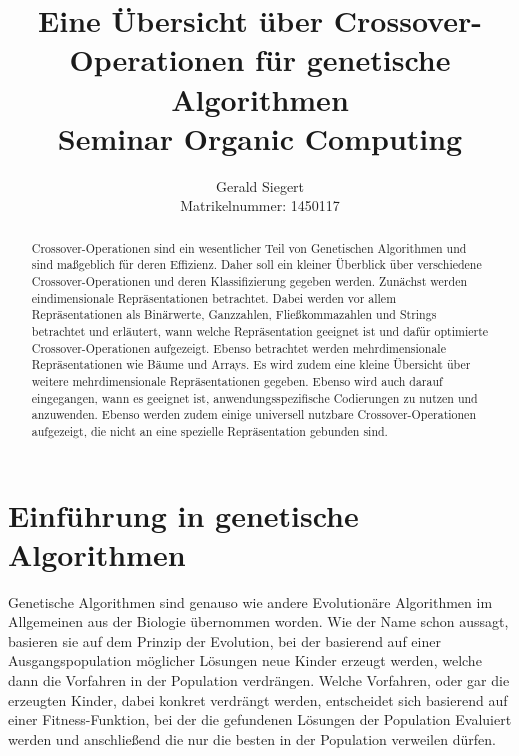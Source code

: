 \documentclass{llncs}
\begin{document}
\mainmatter

\title{Eine Übersicht über Crossover-Operationen für genetische Algorithmen\\Seminar Organic Computing}

\author{Gerald Siegert\\Matrikelnummer: 1450117}
\tocauthor{}


\maketitle


\begin{abstract}
	Crossover-Operationen sind ein wesentlicher Teil von Genetischen Algorithmen und sind maßgeblich für deren Effizienz. Daher soll ein kleiner Überblick über verschiedene Crossover-Operationen und deren Klassifizierung gegeben werden. Zunächst werden eindimensionale Repräsentationen betrachtet. Dabei werden vor allem Repräsentationen als Binärwerte, Ganzzahlen, Fließkommazahlen und Strings betrachtet und erläutert, wann welche Repräsentation geeignet ist und dafür optimierte Crossover-Operationen aufgezeigt. Ebenso betrachtet werden mehrdimensionale Repräsentationen wie Bäume und Arrays. Es wird zudem eine kleine Übersicht über weitere mehrdimensionale Repräsentationen gegeben. Ebenso wird auch darauf eingegangen, wann es geeignet ist, anwendungsspezifische Codierungen zu nutzen und anzuwenden. Ebenso werden zudem einige universell nutzbare Crossover-Operationen aufgezeigt, die nicht an eine spezielle Repräsentation gebunden sind.
\end{abstract}

\pagebreak

\section{Einführung in genetische Algorithmen}
\label{sec:EinfuhrungGA}

	Genetische Algorithmen sind genauso wie andere Evolutionäre Algorithmen im Allgemeinen aus der Biologie übernommen worden. Wie der Name schon aussagt, basieren sie auf dem Prinzip der Evolution, bei der basierend auf einer Ausgangspopulation möglicher Lösungen neue Kinder erzeugt werden, welche dann die Vorfahren in der Population verdrängen. Welche Vorfahren, oder gar die erzeugten Kinder, dabei konkret verdrängt werden, entscheidet sich basierend auf einer Fitness-Funktion, bei der die gefundenen Lösungen der Population Evaluiert werden und anschließend die nur die besten in der Population verweilen dürfen.
	
\end{document}
